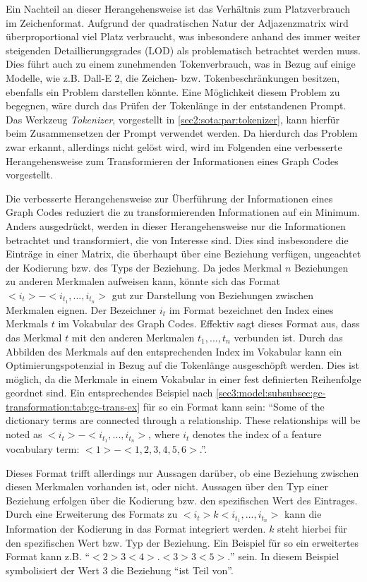 Ein Nachteil an dieser Herangehensweise ist das Verhältnis zum Platzverbrauch im Zeichenformat.
Aufgrund der quadratischen Natur der Adjazenzmatrix wird überproportional viel Platz verbraucht, was inbesondere anhand des immer weiter steigenden Detaillierungsgrades (LOD) als problematisch betrachtet werden muss.
Dies führt auch zu einem zunehmenden Tokenverbrauch, was in Bezug auf einige Modelle, wie z.B. Dall-E 2, die Zeichen- bzw. Tokenbeschränkungen besitzen, ebenfalls ein Problem darstellen könnte.
Eine Möglichkeit diesem Problem zu begegnen, wäre durch das Prüfen der Tokenlänge in der entstandenen Prompt.
Das Werkzeug \textit{Tokenizer}, vorgestellt in \cref{sec2:sota:par:tokenizer}, kann hierfür beim Zusammensetzen der Prompt verwendet werden.
Da hierdurch das Problem zwar erkannt, allerdings nicht gelöst wird, wird im Folgenden eine verbesserte Herangehensweise zum Transformieren der Informationen eines Graph Codes vorgestellt.

Die verbesserte Herangehensweise zur Überführung der Informationen eines Graph Codes reduziert die zu transformierenden Informationen auf ein Minimum.
Anders ausgedrückt, werden in dieser Herangehensweise nur die Informationen betrachtet und transformiert, die von Interesse sind.
Dies sind insbesondere die Einträge in einer Matrix, die überhaupt über eine Beziehung verfügen, ungeachtet der Kodierung bzw. des Typs der Beziehung.
Da jedes Merkmal $n$ Beziehungen zu anderen Merkmalen aufweisen kann, könnte sich das Format $<i_{t}> - <i_{t_{1}},...,i_{t_{n}}>$ gut zur Darstellung von Beziehungen zwischen Merkmalen eignen.
Der Bezeichner $i_{t}$ im Format bezeichnet den Index eines Merkmals $t$ im Vokabular des Graph Codes.
Effektiv sagt dieses Format aus, dass das Merkmal $t$ mit den anderen Merkmalen $t_1,...,t_n$ verbunden ist.
Durch das Abbilden des Merkmals auf den entsprechenden Index im Vokabular kann ein Optimierungspotenzial in Bezug auf die Tokenlänge ausgeschöpft werden.
Dies ist möglich, da die Merkmale in einem Vokabular in einer fest definierten Reihenfolge geordnet sind.
Ein entsprechendes Beispiel nach \cref{sec3:model:subsubsec:gc-transformation:tab:gc-trans-ex} für so ein Format kann sein: \enquote{Some of the dictionary terms are connected through a relationship. These relationships will be noted as $<i_{t}> - <i_{t_{1}},...,i_{t_{n}}>$, where $i_{t}$ denotes the index of a feature vocabulary term: $<1> - <1,2,3,4,5,6>$.}.

Dieses Format trifft allerdings nur Aussagen darüber, ob eine Beziehung zwischen diesen Merkmalen vorhanden ist, oder nicht.
Aussagen über den Typ einer Beziehung erfolgen über die Kodierung bzw. den spezifischen Wert des Eintrages.
Durch eine Erweiterung des Formats zu $<i_{t}> k <i_{t_1},...,i_{t_n}>$ kann die Information der Kodierung in das Format integriert werden.
$k$ steht hierbei für den spezifischen Wert bzw. Typ der Beziehung.
Ein Beispiel für so ein erweitertes Format kann z.B. \enquote{$<2> 3 <4>. <3> 3 <5>.$} sein.
In diesem Beispiel symbolisiert der Wert 3 die Beziehung \enquote{ist Teil von}.

